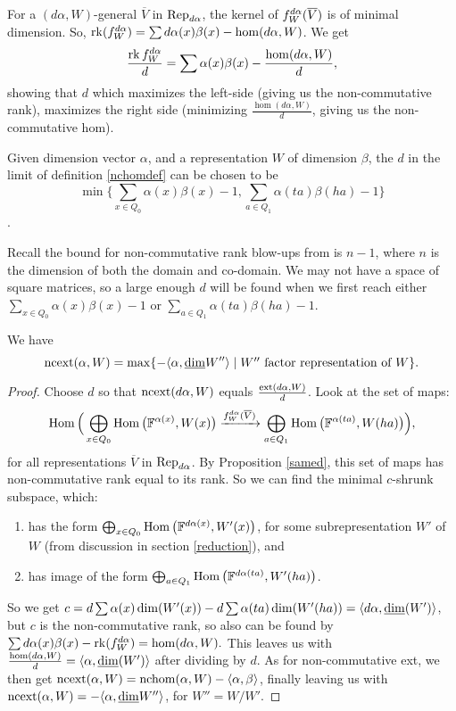 For a $(d\alpha,W)$-general $\overline{V}$ in $\operatorname{Rep}_{d\alpha}$, the kernel of $f_{W}^{d\alpha}(\overline{V})$ is of minimal dimension. So, $\operatorname{rk}(f_{W}^{d\alpha})=\sum d\alpha(x)\beta(x)-\hom(d\alpha,W)$. We get $$\frac{\operatorname{rk} f_{W}^{d\alpha}}{d}=\sum\alpha(x)\beta(x)-\frac{\hom(d\alpha,W)}{d},$$
showing that $d$ which maximizes the left-side (giving us the non-commutative rank), maximizes the right side (minimizing $\frac{\hom(d\alpha,W)}{d}$, giving us the non-commutative hom).

\begin{corr}
Given dimension vector $\alpha$, and a representation $W$ of dimension $\beta$, the $d$ in the limit of definition \ref{nchomdef} can be chosen to be $$\min\Big\{\sum_{x\in Q_0}\alpha(x)\beta(x)-1,\sum_{a\in Q_1}\alpha(ta)\beta(ha)-1\Big\}$$.
\end{corr}
Recall the bound for non-commutative rank blow-ups from \cite{DM18} is $n-1$, where $n$ is the dimension of both the domain and co-domain. We may not have a space of square matrices, so a large enough $d$ will be found when we first reach either $\sum_{x\in Q_0}\alpha(x)\beta(x)-1$ or $\sum_{a\in Q_1}\alpha(ta)\beta(ha)-1$. 

\begin{theorem}\label{ncext}
We have
$$
\operatorname{ncext}(\alpha,W)=\max\{-\langle\alpha,\underline{\rm dim} W'' \rangle \mid \mbox{$W''$ factor representation of $W$}\}.
$$
\end{theorem}
\begin{proof}

Choose $d$ so that $\operatorname{ncext}(d\alpha,W)$ equals $\frac{\operatorname{ext}(d\alpha,W)}{d}$. Look at the set of maps:
$$\operatorname{Hom}\Big(\bigoplus_{x\in Q_0}\operatorname{Hom}\big({\mathbb F}^{\alpha(x)},W(x)\big)\xrightarrow{f_{W}^{d\alpha}(\overline{V})}\bigoplus_{a\in Q_1}\operatorname{Hom}\big({\mathbb F}^{\alpha(ta)},W(ha)\big) \Big),$$
for all representations $\overline{V}$ in $\operatorname{Rep}_{d\alpha}$. By Proposition \ref{samed}, this set of maps has non-commutative rank equal to its rank. So we can find the minimal $c$-shrunk subspace, which:
\begin{enumerate}
    \item has the form $\bigoplus_{x\in Q_0}\operatorname{Hom}\big({\mathbb F}^{d\alpha(x)},W'(x)\big)$, for some subrepresentation $W'$ of $W$ (from discussion in section \ref{reduction}), and
    \item has image of the form $\bigoplus_{a \in Q_1}\operatorname{Hom}\big({\mathbb F}^{d\alpha(ta)},W'(ha)\big)$.
\end{enumerate}
So we get $c=d\sum\alpha(x)\dim(W'(x))-d\sum\alpha(ta)\dim(W'(ha))=\langle d\alpha,\underline{\rm dim}(W')\rangle$, but $c$ is the non-commutative rank, so also can be found by $\sum d\alpha(x)\beta(x)-\operatorname{rk}(f_{W}^{d\alpha})=\hom(d\alpha,W).$ This leaves us with $\frac{\hom(d\alpha,W)}{d}=\langle\alpha,\underline{\rm dim}(W')\rangle$ after dividing by $d$.
As for non-commutative ext, we then get $\operatorname{ncext}(\alpha,W)=\operatorname{nchom}(\alpha,W)-\langle\alpha,\beta\rangle$, finally leaving us with $\operatorname{ncext}(\alpha,W)=-\langle\alpha,\underline{\rm dim} W'' \rangle$, for $W''=W/W'.$

\end{proof}

